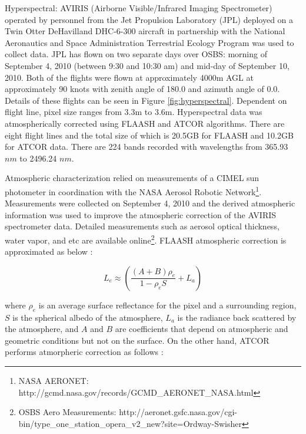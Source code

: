 \documentclass[remotesensing,article,accept,moreauthors,pdftex,12pt,a4paper]{mdpi}
\begin{document}
Hyperspectral: AVIRIS (Airborne Visible/Infrared Imaging Spectrometer) operated by personnel from the Jet Propulsion Laboratory (JPL) deployed on a Twin Otter DeHavilland DHC-6-300 aircraft in partnership with the National Aeronautics and Space Administration Terrestrial Ecology Program was used to collect data. JPL has flown on two separate days over OSBS: morning of September 4, 2010 (between 9:30 and 10:30 am) and mid-day of September 10, 2010. Both of the flights were flown at approximately 4000m AGL at approximately 90 knots with zenith angle of 180.0 and azimuth angle of 0.0. Details of these flights can be seen in Figure \ref{fig:hyperspectral}. Dependent on flight line, pixel size ranges from 3.3m to 3.6m. Hyperspectral data was atmospherically corrected using FLAASH \cite{adler1998flaash} and ATCOR \cite{richter2005atmospheric} algorithms. There are eight flight lines and the total size of which is 20.5GB for FLAASH and 10.2GB for ATCOR data. There are 224 bands recorded with wavelengths from 365.93 $nm$ to 2496.24 $nm$. 

Atmospheric characterization relied on measurements of a CIMEL sun photometer in coordination with the NASA Aerosol Robotic Network\footnote{NASA AERONET: http://gcmd.nasa.gov/records/GCMD\_AERONET\_NASA.html}. Measurements were collected on September 4, 2010 and the derived atmospheric information was used to improve the atmospheric correction of the AVIRIS spectrometer data. Detailed measurements such as aerosol optical thickness, water vapor, and etc are available online\footnote{OSBS Aero Measurements: http://aeronet.gsfc.nasa.gov/cgi-bin/type\_one\_station\_opera\_v2\_new?site=Ordway-Swisher}. FLAASH atmospheric correction is approximated as below \cite{adler1999atmospheric}:

\begin{equation}
L_e \approx (\frac{(A+B)\rho_e}{1-\rho_e S}+L_a)
\end{equation}

where $ \rho_e$ is an average surface reflectance for the pixel and a surrounding region, $S$ is the spherical albedo of the atmosphere, $L_a$ is the radiance back scattered by the atmosphere, and $A$ and $B$ are coefficients that depend on atmospheric and geometric conditions but not on the surface. On the other hand, ATCOR performs atmorpheric correction as follows \cite{Richter2014atcor}:
\end{document}
